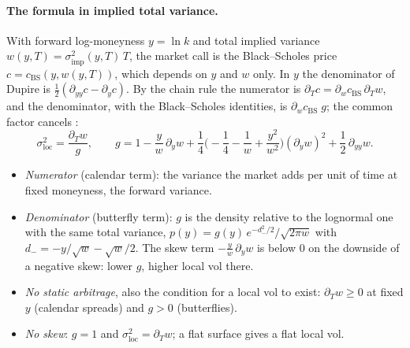 \paragraph{The formula in implied total variance.} With forward log-moneyness $y = \ln k$ and total implied variance
$w(y, T) = \sigma_{\mathrm{imp}}^2(y, T)\,T$, the market call is the Black--Scholes price $c = c_{\mathrm{BS}}(y, w(y, T))$, which depends
on $y$ and $w$ only. In $y$ the denominator of Dupire is $\tfrac12(\partial_{yy} c - \partial_y c)$. By the chain rule the numerator is
$\partial_T c = \partial_w c_{\mathrm{BS}}\,\partial_T w$, and the denominator, with the Black--Scholes identities, is $\partial_w c_{\mathrm{BS}}\; g$; the common factor
cancels \citep[eq.~1.10]{gatheral2006}:
\[
  \sigma_{\mathrm{loc}}^2 = \frac{\partial_T w}{g},\qquad
  g = 1 - \frac{y}{w}\,\partial_y w + \frac14\Big(-\frac14 - \frac1w + \frac{y^2}{w^2}\Big)(\partial_y w)^2 + \frac12\,\partial_{yy} w .
\]
\begin{itemize}[nosep]
  \item \emph{Numerator} (calendar term): the variance the market adds per unit of time at fixed moneyness, the forward
        variance.
  \item \emph{Denominator} (butterfly term): $g$ is the density relative to the lognormal one with the same total variance,
        $p(y) = g(y)\,e^{-d_-^2/2}/\sqrt{2\pi w}$ with $d_- = -y/\sqrt w - \sqrt w/2$. The skew term $-\frac yw\,\partial_y w$ is below $0$ on the downside
        of a negative skew: lower $g$, higher local vol there.
  \item \emph{No static arbitrage}, also the condition for a local vol to exist: $\partial_T w \ge 0$ at fixed $y$ (calendar spreads)
        and $g > 0$ (butterflies).
  \item \emph{No skew}: $g = 1$ and $\sigma_{\mathrm{loc}}^2 = \partial_T w$; a flat surface gives a flat local vol.
\end{itemize}

